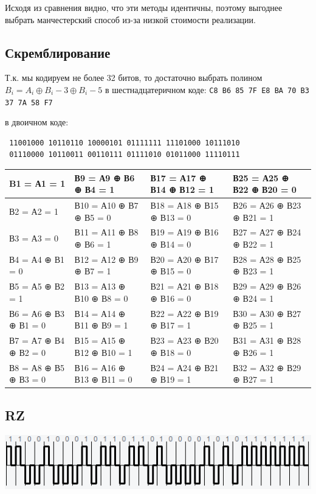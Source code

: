Исходя из сравнения видно, что эти методы идентичны, поэтому выгоднее
выбрать манчестерский способ из-за низкой стоимости реализации.
\subsection{Скремблирование}
Т.к. мы кодируем не более 32 битов, то достаточно выбрать полином $B_i = A_i \oplus B_i-3 \oplus B_i-5$
в шестнадцатеричном коде: \verb|C8 B6 85 7F E8 BA 70 B3 37 7A 58 F7|

в двоичном коде:

\begin{verbatim}
 11001000 10110110 10000101 01111111 11101000 10111010
 01110000 10110011 00110111 01111010 01011000 11110111
\end{verbatim}
\begin{table}[!h]
\scriptsize
\begin{tabular}{|l|l|l|l|}
\hline
B1 = А1 = 1          &В9 = А9 ⊕ В6 ⊕ В4 = 1    &В17 = А17 ⊕ В14 ⊕ В12 = 1&В25 = А25 ⊕ В22 ⊕ В20 = 0 \\ \hline
В2 = А2 = 1          &В10 = А10 ⊕ В7 ⊕ В5 = 0  &В18 = А18 ⊕ В15 ⊕ В13 = 0&В26 = А26 ⊕ В23 ⊕ В21 = 1 \\ \hline
В3 = А3 = 0          &В11 = А11 ⊕ В8 ⊕ В6 = 1  &В19 = А19 ⊕ В16 ⊕ В14 = 0&В27 = А27 ⊕ В24 ⊕ В22 = 1 \\ \hline
В4 = А4 ⊕ В1 = 0     &В12 = А12 ⊕ В9 ⊕ В7 = 1  &В20 = А20 ⊕ В17 ⊕ В15 = 0&В28 = А28 ⊕ В25 ⊕ В23 = 1 \\ \hline
В5 = А5 ⊕ В2 = 1     &В13 = А13 ⊕ В10 ⊕ В8 = 0 &В21 = А21 ⊕ В18 ⊕ В16 = 0&В29 = А29 ⊕ В26 ⊕ В24 = 1 \\ \hline
В6 = А6 ⊕ В3 ⊕ В1 = 0&В14 = А14 ⊕ В11 ⊕ В9 = 1 &В22 = А22 ⊕ В19 ⊕ В17 = 1&В30 = А30 ⊕ В27 ⊕ В25 = 1 \\ \hline
В7 = А7 ⊕ В4 ⊕ В2 = 0&В15 = А15 ⊕ В12 ⊕ В10 = 1&В23 = А23 ⊕ В20 ⊕ В18 = 0&В31 = А31 ⊕ В28 ⊕ В26 = 1 \\ \hline
В8 = А8 ⊕ В5 ⊕ В3 = 0&В16 = А16 ⊕ В13 ⊕ В11 = 0&В24 = А24 ⊕ В21 ⊕ В19 = 1&В32 = А32 ⊕ В29 ⊕ В27 = 1 \\ \hline
\end{tabular}
\end{table}
\subsection{RZ}
\includegraphics[scale=0.7]{img/rz_scra.png}

